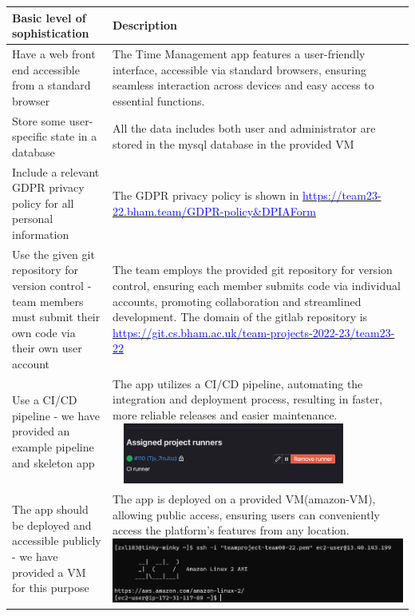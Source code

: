 \documentclass[a4paper]{article}
\begin{document}
\newpage
{\noindent\begin{tabular}{|p{0.25\linewidth}|p{0.75\linewidth}|} 
	\hline
 \textbf{Basic level of sophistication} & \textbf{Description} \\
 \hline
 Have a web front end accessible from a standard browser & The Time Management app features a user-friendly interface, accessible via standard browsers, ensuring seamless interaction across devices and easy access to essential functions.\\
 \hline
 Store some user-specific state in a database&  All the data includes both user and administrator are stored in the mysql database in the provided VM\\
 \hline
 Include a relevant GDPR privacy policy for all personal information & The GDPR privacy policy is shown in \href{https://team23-22.bham.team/GDPR-policy&DPIAForm}{\textcolor{blue}{https://team23-22.bham.team/GDPR-policy\&DPIAForm}}\\
 \hline
 Use the given git repository for version control - team members must submit their own code via their own user account&  The team employs the provided git repository for version control, ensuring each member submits code via individual accounts, promoting collaboration and streamlined development. The domain of the gitlab repository is \href{https://git.cs.bham.ac.uk/team-projects-2022-23/team23-22}{\textcolor{blue}{https://git.cs.bham.ac.uk/team-projects-2022-23/team23-22}}\\
 \hline
 Use a CI/CD pipeline - we have provided an example pipeline and skeleton app&  The app utilizes a CI/CD pipeline, automating the integration and deployment process, resulting in faster, more reliable releases and easier maintenance. \includegraphics[width=8cm, height=2cm]{./image/CI_CD.png}\\
 \hline
 The app should be deployed and accessible publicly - we have provided a VM for this purpose& The app is deployed on a provided VM(amazon-VM), allowing public access, ensuring users can conveniently access the platform's features from any location.\includegraphics[width=10cm]{./image/VM.png}\\

\end{tabular}}
\end{document}
